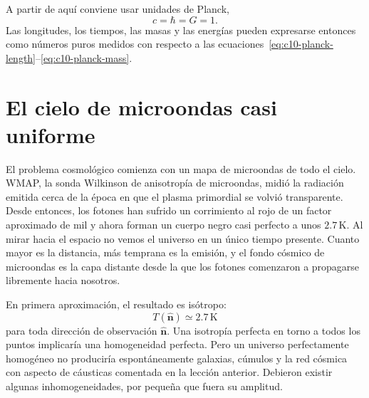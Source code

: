 A partir de aquí conviene usar unidades de Planck,
\begin{equation}
c=\hbar=G=1.
\label{eq:c10-planck-units}
\end{equation}
Las longitudes, los tiempos, las masas y las energías pueden expresarse entonces como números puros medidos con respecto a las ecuaciones~\eqref{eq:c10-planck-length}--\eqref{eq:c10-planck-mass}.

\section{El cielo de microondas casi uniforme}

El problema cosmológico comienza con un mapa de microondas de todo el cielo. WMAP, la sonda Wilkinson de anisotropía de microondas, midió la radiación emitida cerca de la época en que el plasma primordial se volvió transparente. Desde entonces, los fotones han sufrido un corrimiento al rojo de un factor aproximado de mil y ahora forman un cuerpo negro casi perfecto a unos \(2.7\,\mathrm K\). Al mirar hacia el espacio no vemos el universo en un único tiempo presente. Cuanto mayor es la distancia, más temprana es la emisión, y el fondo cósmico de microondas es la capa distante desde la que los fotones comenzaron a propagarse libremente hacia nosotros.

\begin{classroomqa}
\end{classroomqa}

En primera aproximación, el resultado es isótropo:
\[
T(\hat{\mathbf n})\simeq 2.7\,\mathrm K
\]
para toda dirección de observación \(\hat{\mathbf n}\). Una isotropía perfecta en torno a todos los puntos implicaría una homogeneidad perfecta. Pero un universo perfectamente homogéneo no produciría espontáneamente galaxias, cúmulos y la red cósmica con aspecto de cáusticas comentada en la lección anterior. Debieron existir algunas inhomogeneidades, por pequeña que fuera su amplitud.

